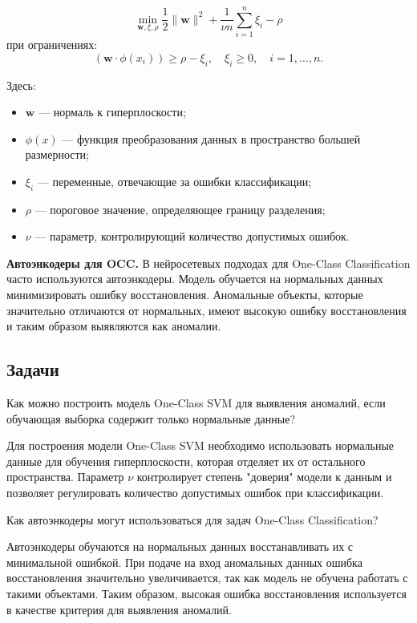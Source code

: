 \[
    \min_{\mathbf{w}, \xi, \rho} \frac{1}{2} \|\mathbf{w}\|^2 + \frac{1}{\nu n} \sum_{i=1}^n \xi_i - \rho
\]
при ограничениях:
\[
    (\mathbf{w} \cdot \phi(x_i)) \geq \rho - \xi_i, \quad \xi_i \geq 0, \quad i = 1, \dots, n.
\]

Здесь:
\begin{itemize}
    \item \( \mathbf{w} \) — нормаль к гиперплоскости;
    \item \( \phi(x) \) — функция преобразования данных в пространство большей размерности;
    \item \( \xi_i \) — переменные, отвечающие за ошибки классификации;
    \item \( \rho \) — пороговое значение, определяющее границу разделения;
    \item \( \nu \) — параметр, контролирующий количество допустимых ошибок.
\end{itemize}

\textbf{Автоэнкодеры для OCC.} В нейросетевых подходах для One-Class Classification часто используются автоэнкодеры. Модель обучается на нормальных данных минимизировать ошибку восстановления. Аномальные объекты, которые значительно отличаются от нормальных, имеют высокую ошибку восстановления и таким образом выявляются как аномалии.

\subsection{Задачи}

\problem Как можно построить модель One-Class SVM для выявления аномалий, если обучающая выборка содержит только нормальные данные?

\solution Для построения модели One-Class SVM необходимо использовать нормальные данные для обучения гиперплоскости, которая отделяет их от остального пространства. Параметр \( \nu \) контролирует степень "доверия" модели к данным и позволяет регулировать количество допустимых ошибок при классификации.

\problem Как автоэнкодеры могут использоваться для задач One-Class Classification?

\solution Автоэнкодеры обучаются на нормальных данных восстанавливать их с минимальной ошибкой. При подаче на вход аномальных данных ошибка восстановления значительно увеличивается, так как модель не обучена работать с такими объектами. Таким образом, высокая ошибка восстановления используется в качестве критерия для выявления аномалий.

